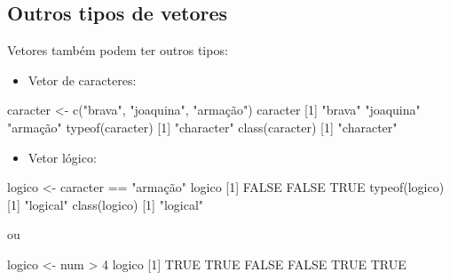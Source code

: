 \documentclass[
  10pt,
  a4paper]{book}
\newenvironment{Shaded}{\begin{snugshade}}{\end{snugshade}}
\newcommand{\ConstantTok}[1]{\textcolor[rgb]{0.00,0.00,0.00}{#1}}
\newcommand{\DecValTok}[1]{\textcolor[rgb]{0.00,0.00,0.81}{#1}}
\newcommand{\FunctionTok}[1]{\textcolor[rgb]{0.00,0.00,0.00}{#1}}
\newcommand{\NormalTok}[1]{#1}
\newcommand{\OtherTok}[1]{\textcolor[rgb]{0.56,0.35,0.01}{#1}}
\newcommand{\SpecialCharTok}[1]{\textcolor[rgb]{0.00,0.00,0.00}{#1}}
\newcommand{\StringTok}[1]{\textcolor[rgb]{0.31,0.60,0.02}{#1}}
\providecommand{\tightlist}{%
  \setlength{\itemsep}{0pt}\setlength{\parskip}{0pt}}
\begin{document}
\hypertarget{outros-tipos-de-vetores}{%
\subsection{Outros tipos de vetores}\label{outros-tipos-de-vetores}}

Vetores também podem ter outros tipos:

\begin{itemize}
\tightlist
\item
  Vetor de caracteres:
\end{itemize}

\begin{Shaded}
\begin{Highlighting}[]
\NormalTok{caracter }\OtherTok{\textless{}{-}} \FunctionTok{c}\NormalTok{(}\StringTok{"brava"}\NormalTok{, }\StringTok{"joaquina"}\NormalTok{, }\StringTok{"armação"}\NormalTok{)}
\NormalTok{caracter}
\NormalTok{[}\DecValTok{1}\NormalTok{] }\StringTok{"brava"}    \StringTok{"joaquina"} \StringTok{"armação"} 
\FunctionTok{typeof}\NormalTok{(caracter)}
\NormalTok{[}\DecValTok{1}\NormalTok{] }\StringTok{"character"}
\FunctionTok{class}\NormalTok{(caracter)}
\NormalTok{[}\DecValTok{1}\NormalTok{] }\StringTok{"character"}
\end{Highlighting}
\end{Shaded}

\begin{itemize}
\tightlist
\item
  Vetor lógico:
\end{itemize}

\begin{Shaded}
\begin{Highlighting}[]
\NormalTok{logico }\OtherTok{\textless{}{-}}\NormalTok{ caracter }\SpecialCharTok{==} \StringTok{"armação"}
\NormalTok{logico}
\NormalTok{[}\DecValTok{1}\NormalTok{] }\ConstantTok{FALSE} \ConstantTok{FALSE}  \ConstantTok{TRUE}
\FunctionTok{typeof}\NormalTok{(logico)}
\NormalTok{[}\DecValTok{1}\NormalTok{] }\StringTok{"logical"}
\FunctionTok{class}\NormalTok{(logico)}
\NormalTok{[}\DecValTok{1}\NormalTok{] }\StringTok{"logical"}
\end{Highlighting}
\end{Shaded}

ou

\begin{Shaded}
\begin{Highlighting}[]
\NormalTok{logico }\OtherTok{\textless{}{-}}\NormalTok{ num }\SpecialCharTok{\textgreater{}} \DecValTok{4}
\NormalTok{logico}
\NormalTok{[}\DecValTok{1}\NormalTok{]  }\ConstantTok{TRUE}  \ConstantTok{TRUE} \ConstantTok{FALSE} \ConstantTok{FALSE}  \ConstantTok{TRUE}  \ConstantTok{TRUE}
\end{Highlighting}
\end{Shaded}
\end{document}
